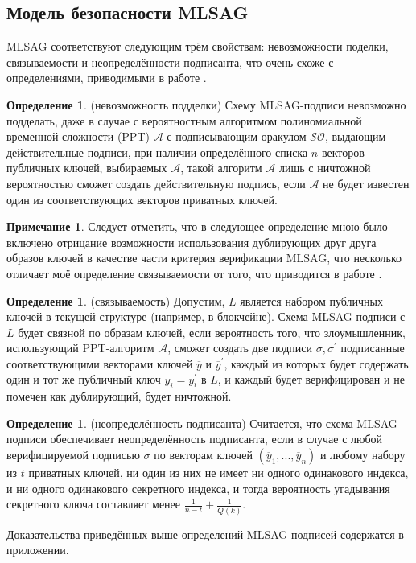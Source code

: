 \documentclass{mrl}
\theoremstyle{definition}
\numberwithin{thm}{section}
\newtheorem{rem}[thm]{Примечание}
\newtheorem{defn}[thm]{Определение}
\begin{document}
\subsection{Модель безопасности MLSAG}

MLSAG соответствуют следующим трём свойствам: невозможности поделки, связываемости и неопределённости подписанта, что очень схоже с определениями, приводимыми в работе \cite{LWW}.
\begin{defn}
\label{defn:(Unforgeability)--An}(невозможность подделки) %
{} Схему MLSAG-подписи невозможно подделать, даже в случае с вероятностным алгоритмом полиномиальной временной сложности (PPT) $\mathcal{A}$ с подписывающим оракулом $\mathcal{SO}$, выдающим действительные подписи, при наличии определённого списка $n$ векторов публичных ключей, выбираемых $\mathcal{A}$, такой алгоритм $\mathcal{A}$ лишь с ничтожной вероятностью сможет создать действительную подпись, если $\mathcal{A}$ не будет известен один из соответствующих векторов приватных ключей.
\end{defn}
\begin{rem}
Следует отметить, что в следующее определение мною было включено отрицание возможности использования дублирующих друг друга образов ключей в качестве части критерия верификации MLSAG, что несколько отличает моё определение связываемости от того, что приводится в работе \cite{LWW}.
\end{rem}
\begin{defn}
\label{defn:(Linkability)}(связываемость) Допустим, $L$ является набором публичных ключей в текущей структуре (например, в блокчейне). Схема MLSAG-подписи с $L$ будет связной по образам ключей, если вероятность того, что злоумышленник, использующий PPT-алгоритм $\mathcal{A}$, сможет создать две подписи $\sigma,\sigma^{\prime}$ подписанные соответствующими векторами ключей $\overline{y}$ и $\overline{y}^{\prime}$, каждый из которых будет содержать один и тот же публичный ключ $y_{i}=y$$_{i}^{\prime}$ в $L$, и каждый будет верифицирован и не помечен как дублирующий, будет ничтожной.
\end{defn}
\begin{defn}
\label{defn:(Signer-Ambiguity-)}(неопределённость подписанта) Считается, что схема MLSAG-подписи обеспечивает неопределённость подписанта, если в случае с любой верифицируемой подписью $\sigma$ по векторам ключей $\left(\overline{y}_{1},...,\overline{y}_{n}\right)$ и любому набору из $t$ приватных ключей, ни один из них не имеет ни одного одинакового индекса, и ни одного одинакового секретного индекса, и тогда вероятность угадывания секретного ключа составляет менее $\frac{1}{n-t}+\frac{1}{Q\left(k\right)}$.
\end{defn}
Доказательства приведённых выше определений MLSAG-подписей содержатся в приложении.
\end{document}
